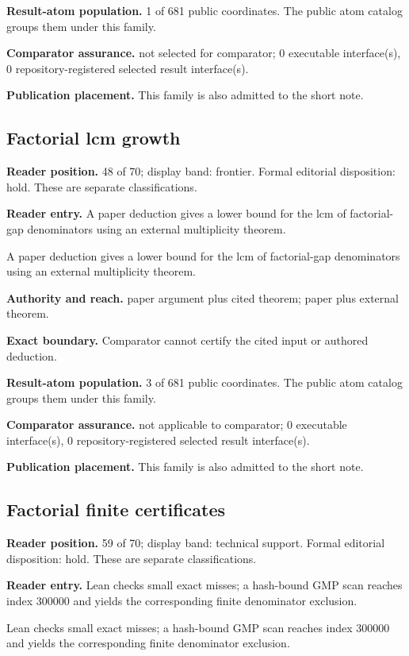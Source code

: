 \documentclass[11pt]{article}
\begin{document}
\textbf{Result-atom population.} 1 of 681 public coordinates. The public atom catalog groups them under this family.

\textbf{Comparator assurance.} not selected for comparator; 0 executable interface(s), 0 repository-registered selected result interface(s).

\textbf{Publication placement.} This family is also admitted to the short note.

\subsection{Factorial lcm growth}
\textbf{Reader position.} 48 of 70; display band: frontier.  Formal editorial disposition: hold.  These are separate classifications.

\textbf{Reader entry.} A paper deduction gives a lower bound for the lcm of factorial-gap denominators using an external multiplicity theorem.

A paper deduction gives a lower bound for the lcm of factorial-gap denominators using an external multiplicity theorem.

\textbf{Authority and reach.} paper argument plus cited theorem; paper plus external theorem.

\textbf{Exact boundary.} Comparator cannot certify the cited input or authored deduction.

\textbf{Result-atom population.} 3 of 681 public coordinates. The public atom catalog groups them under this family.

\textbf{Comparator assurance.} not applicable to comparator; 0 executable interface(s), 0 repository-registered selected result interface(s).

\textbf{Publication placement.} This family is also admitted to the short note.

\subsection{Factorial finite certificates}
\textbf{Reader position.} 59 of 70; display band: technical support.  Formal editorial disposition: hold.  These are separate classifications.

\textbf{Reader entry.} Lean checks small exact misses; a hash-bound GMP scan reaches index 300000 and yields the corresponding finite denominator exclusion.

Lean checks small exact misses; a hash-bound GMP scan reaches index 300000 and yields the corresponding finite denominator exclusion.
\end{document}

